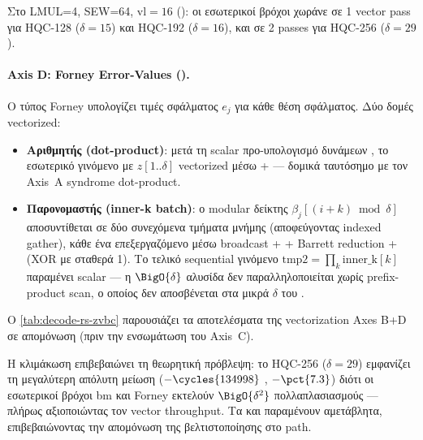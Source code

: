 Στο LMUL=4, SEW=64, $\text{vl}=16$ (): οι εσωτερικοί βρόχοι
χωράνε σε \num{1} vector pass για HQC-128 ($\delta=15$) και HQC-192
($\delta=16$), και σε \num{2} passes για HQC-256 ($\delta=29$).

\paragraph{Axis D: Forney Error-Values ().}
Ο τύπος Forney υπολογίζει τιμές σφάλματος $e_j$ για κάθε θέση σφάλματος.
Δύο δομές vectorized:

\begin{itemize}
  \item \textbf{Αριθμητής (dot-product)}: μετά τη scalar προ-υπολογισμό
        δυνάμεων , το εσωτερικό γινόμενο με
        $z[1..\delta]$ vectorized μέσω  +  —
        δομικά ταυτόσημο με τον Axis~A syndrome dot-product.
  \item \textbf{Παρονομαστής (inner-k batch)}: ο modular δείκτης
        $\beta_j[(i+k) \bmod \delta]$ αποσυντίθεται σε δύο συνεχόμενα
        τμήματα μνήμης (αποφεύγοντας indexed gather), κάθε ένα
        επεξεργαζόμενο μέσω broadcast  +  +
        Barrett reduction +  (XOR με σταθερά \num{1}).  Το
        τελικό sequential γινόμενο $\text{tmp2} = \prod_{k} \text{inner\_k}[k]$
        παραμένει scalar — η $\BigO{\delta}$ αλυσίδα δεν παραλληλοποιείται
        χωρίς prefix-product scan, ο οποίος δεν αποσβένεται στα μικρά
        $\delta$ του \HQC.
\end{itemize}

Ο \cref{tab:decode-rs-zvbc} παρουσιάζει τα αποτελέσματα της vectorization
Axes B+D σε απομόνωση (πριν την ενσωμάτωση του Axis~C).

\begin{table}[htbp]
  \centering
  \caption{Αποτελέσματα \Zvbc vectorization Axes B+D στο \Decaps \instret.
           Η βελτίωση κλιμακώνεται με $\delta^2$ — μέγιστη στο HQC-256
           ($\delta=29$).}
  \label{tab:decode-rs-zvbc}
  
\end{table}

Η κλιμάκωση επιβεβαιώνει τη θεωρητική πρόβλεψη: το HQC-256 ($\delta=29$)
εμφανίζει τη μεγαλύτερη απόλυτη μείωση ($-\cycles{134998}$ \instret,
$-\pct{7.3}$) διότι οι εσωτερικοί βρόχοι \gls{bm} και Forney εκτελούν
$\BigO{\delta^2}$ πολλαπλασιασμούς — πλήρως αξιοποιώντας τον vector
throughput.  Τα \KeyGen και \Encaps παραμένουν αμετάβλητα, επιβεβαιώνοντας
την απομόνωση της βελτιστοποίησης στο \Decaps path.

